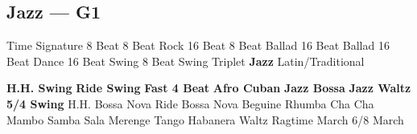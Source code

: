 \subsection{Jazz --- G1}
Time Signature
8 Beat
8 Beat Rock
16 Beat
8 Beat Ballad
16 Beat Ballad
16 Beat Dance
16 Beat Swing
8 Beat Swing
Triplet
\textbf{Jazz}
Latin/Traditional





























\textbf{H.H. Swing}
\textbf{Ride Swing}
\textbf{Fast 4 Beat}
\textbf{Afro Cuban}
\textbf{Jazz Bossa}
\textbf{Jazz Waltz}
\textbf{5/4 Swing}
H.H. Bossa Nova
Ride Bossa Nova
Beguine
Rhumba
Cha Cha
Mambo
Samba
Sala
Merenge
Tango
Habanera
Waltz
Ragtime
March
6/8 March
